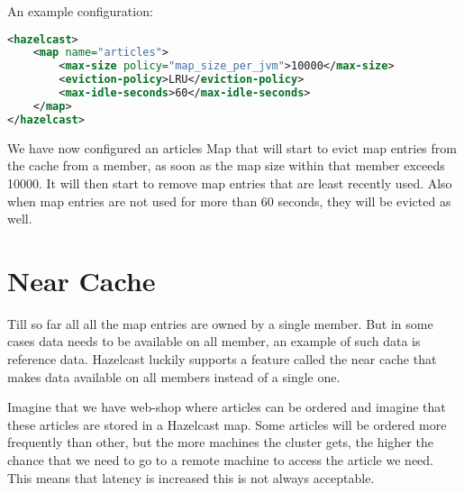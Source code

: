 An example configuration:
\begin{lstlisting}[language=xml]
<hazelcast>
    <map name="articles">
        <max-size policy="map_size_per_jvm">10000</max-size>
        <eviction-policy>LRU</eviction-policy>
        <max-idle-seconds>60</max-idle-seconds>
    </map>
</hazelcast>
\end{lstlisting}
We have now configured an articles Map that will start to evict map entries from the cache from a member, as soon as the map size within that member exceeds 10000. It will then start to remove map entries that are least recently used. Also when map entries are not used for more than 60 seconds, they will be evicted as well.

\section{Near Cache}
Till so far all all the map entries are owned by a single member. But in some cases data needs to be available on all member, an example of such data is reference data. Hazelcast luckily supports a feature called the near cache that makes data available on all members instead of a single one.

Imagine that we have web-shop where articles can be ordered and imagine that these articles are stored in a Hazelcast map. Some articles will be ordered more frequently than other, but the more machines the cluster gets, the higher the chance that we need to go to a remote machine to access the article we need. This means that latency is increased this is not always acceptable.

